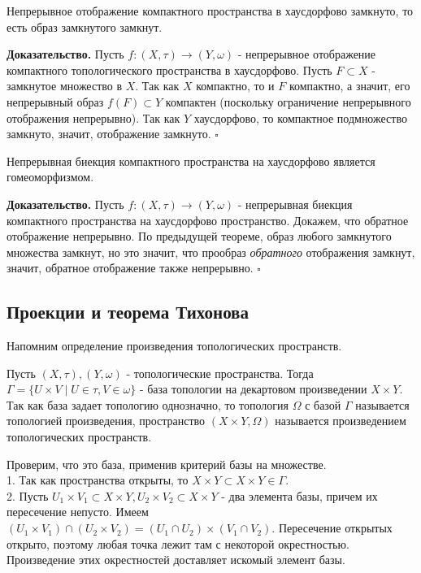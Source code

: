 \begin{theor}
Непрерывное отображение компактного пространства в хаусдорфово замкнуто, 
то есть образ замкнутого замкнут. 
\end{theor}
\textbf{Доказательство.}  Пусть $f\colon(X,\tau)\to(Y,\omega)$ - непрерывное
отображение компактного топологического пространства в хаусдорфово. Пусть
 $F\subset X$ - замкнутое множество в $X$. Так как  $X$ компактно, то и 
  $F$ компактно, а значит, его непрерывный образ $f(F)\subset Y$ компактен
  (поскольку ограничение непрерывного отображения непрерывно).  
Так как $Y$ хаусдорфово, то компактное подмножество замкнуто, значит,  
отображение замкнуто. $\square$ 
\begin{theor}
Непрерывная биекция компактного пространства на хаусдорфово является
гомеоморфизмом.
\end{theor}
\textbf{Доказательство.} Пусть $f\colon(X,\tau)\to(Y,\omega)$ -
непрерывная биекция компактного пространства на хаусдорфово пространство.
Докажем, что обратное отображение непрерывно. По предыдущей теореме, 
образ любого замкнутого множества замкнут, но это значит, что прообраз 
\textit{обратного} отображения замкнут, значит, обратное отображение также 
непрерывно. $\square$ 
\subsection{Проекции и теорема Тихонова}
Напомним определение произведения топологических пространств. 
\begin{defin}
Пусть $(X,\tau),(Y,\omega)$ - топологические пространства. Тогда 
$\Gamma=\{U\times V\mid U\in \tau,V\in \omega\}$ - база топологии на 
декартовом произведении $X\times Y$. Так как база задает топологию 
однозначно, то топология $\Omega$ с базой $\Gamma$ называется топологией 
произведения, пространство  $(X\times Y,\Omega)$ называется произведением
топологических пространств.
\end{defin}
Проверим, что это база, применив критерий базы на множестве.\\
1. Так как пространства открыты, то $X\times Y\subset X\times Y\in \Gamma$.\\
2. Пусть $U_1\times V_1\subset X\times Y,U_2\times V_2\subset X\times Y$ - 
два элемента базы, причем их пересечение непусто. Имеем
$(U_1\times V_1)\cap(U_2\times V_2)=(U_1\cap U_2)\times (V_1\cap V_2)$. 
Пересечение открытых открыто, поэтому любая точка лежит там с 
некоторой окрестностью. Произведение этих окрестностей доставляет 
искомый элемент базы. 

